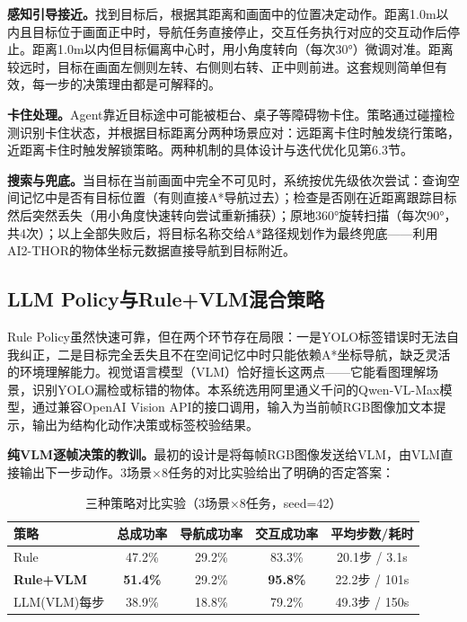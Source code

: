 \documentclass{SYSUReport}
\begin{document}
\textbf{感知引导接近。}找到目标后，根据其距离和画面中的位置决定动作。距离1.0m以内且目标位于画面正中时，导航任务直接停止，交互任务执行对应的交互动作后停止。距离1.0m以内但目标偏离中心时，用小角度转向（每次30°）微调对准。距离较远时，目标在画面左侧则左转、右侧则右转、正中则前进。这套规则简单但有效，每一步的决策理由都是可解释的。

\textbf{卡住处理。}Agent靠近目标途中可能被柜台、桌子等障碍物卡住。策略通过碰撞检测识别卡住状态，并根据目标距离分两种场景应对：远距离卡住时触发绕行策略，近距离卡住时触发解锁策略。两种机制的具体设计与迭代优化见第6.3节。

\textbf{搜索与兜底。}当目标在当前画面中完全不可见时，系统按优先级依次尝试：查询空间记忆中是否有目标位置（有则直接A*导航过去）；检查是否刚在近距离跟踪目标然后突然丢失（用小角度快速转向尝试重新捕获）；原地360°旋转扫描（每次90°，共4次）；以上全部失败后，将目标名称交给A*路径规划作为最终兜底——利用AI2-THOR的物体坐标元数据直接导航到目标附近。

\subsection{LLM Policy与Rule+VLM混合策略}

Rule Policy虽然快速可靠，但在两个环节存在局限：一是YOLO标签错误时无法自我纠正，二是目标完全丢失且不在空间记忆中时只能依赖A*坐标导航，缺乏灵活的环境理解能力。视觉语言模型（VLM）恰好擅长这两点——它能看图理解场景，识别YOLO漏检或标错的物体。本系统选用阿里通义千问的Qwen-VL-Max模型，通过兼容OpenAI Vision API的接口调用，输入为当前帧RGB图像加文本提示，输出为结构化动作决策或标签校验结果。

\textbf{纯VLM逐帧决策的教训。}最初的设计是将每帧RGB图像发送给VLM，由VLM直接输出下一步动作。3场景×8任务的对比实验给出了明确的否定答案：

\begin{table}[!ht]
  \centering
  \caption{三种策略对比实验（3场景×8任务，seed=42）}
  \label{tab:policy_compare}
  \begin{tabular}{lcccc}
    \toprule
    策略 & 总成功率 & 导航成功率 & 交互成功率 & 平均步数/耗时 \\
    \midrule
    Rule & 47.2\% & 29.2\% & 83.3\% & 20.1步 / 3.1s \\
    \textbf{Rule+VLM} & \textbf{51.4\%} & 29.2\% & \textbf{95.8\%} & 22.2步 / 101s \\
    LLM(VLM)每步 & 38.9\% & 18.8\% & 79.2\% & 49.3步 / 150s \\
    \bottomrule
  \end{tabular}
\end{table}
\end{document}
